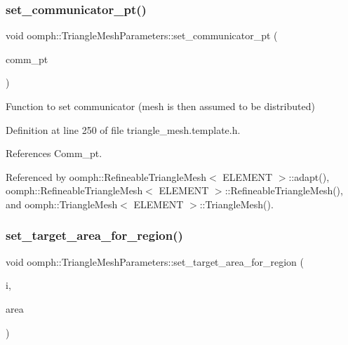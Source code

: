 \subsubsection{\texorpdfstring{set\+\_\+communicator\+\_\+pt()}{set\_communicator\_pt()}}
{\footnotesize\ttfamily void oomph\+::\+Triangle\+Mesh\+Parameters\+::set\+\_\+communicator\+\_\+pt (\begin{DoxyParamCaption}\item[{Oomph\+Communicator $\ast$}]{comm\+\_\+pt }\end{DoxyParamCaption})\hspace{0.3cm}{\ttfamily [inline]}}



Function to set communicator (mesh is then assumed to be distributed) 



Definition at line 250 of file triangle\+\_\+mesh.\+template.\+h.



References Comm\+\_\+pt.



Referenced by oomph\+::\+Refineable\+Triangle\+Mesh$<$ E\+L\+E\+M\+E\+N\+T $>$\+::adapt(), oomph\+::\+Refineable\+Triangle\+Mesh$<$ E\+L\+E\+M\+E\+N\+T $>$\+::\+Refineable\+Triangle\+Mesh(), and oomph\+::\+Triangle\+Mesh$<$ E\+L\+E\+M\+E\+N\+T $>$\+::\+Triangle\+Mesh().

\mbox{\label{classoomph_1_1TriangleMeshParameters_a37618337c703c7bef4b6a657f12670bd}} 
\subsubsection{\texorpdfstring{set\+\_\+target\+\_\+area\+\_\+for\+\_\+region()}{set\_target\_area\_for\_region()}}
{\footnotesize\ttfamily void oomph\+::\+Triangle\+Mesh\+Parameters\+::set\+\_\+target\+\_\+area\+\_\+for\+\_\+region (\begin{DoxyParamCaption}\item[{const unsigned \&}]{i,  }\item[{const double \&}]{area }\end{DoxyParamCaption})\hspace{0.3cm}{\ttfamily [inline]}}



